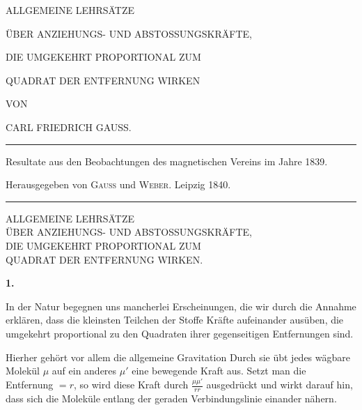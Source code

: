 \clearpage
\thispagestyle{empty}
\begin{center}
\vspace*{0.6in}
{\Large ALLGEMEINE LEHRSÄTZE\par}
\bigskip
ÜBER ANZIEHUNGS- UND ABSTOSSUNGSKRÄFTE,\par
\bigskip
DIE UMGEKEHRT PROPORTIONAL ZUM\par
\bigskip
{\Large QUADRAT DER ENTFERNUNG WIRKEN\par}
\vspace{0.5in}
VON\par
\bigskip
{\large CARL FRIEDRICH GAUSS.\par}
\vfill
\rule{0.85\textwidth}{0.3pt}\par
Resultate aus den Beobachtungen des magnetischen Vereins im Jahre 1839.\par
Herausgegeben von \textsc{Gauss} und \textsc{Weber}. Leipzig 1840.\par
\rule{0.85\textwidth}{0.3pt}
\end{center}
\clearpage
{}
\renewcommand{\Article}[1]{\par\medskip\Needspace{4\baselineskip}\pdfbookmark[1]{Art. #1}{lehrsaetze-art-#1}\centerline{\textbf{#1.}}\nobreak\smallskip}
\begin{center}
ALLGEMEINE LEHRSÄTZE\\
ÜBER ANZIEHUNGS- UND ABSTOSSUNGSKRÄFTE,\\
DIE UMGEKEHRT PROPORTIONAL ZUM\\
QUADRAT DER ENTFERNUNG WIRKEN.
\end{center}
\Article{1}
In der Natur begegnen uns mancherlei Erscheinungen, die wir durch die Annahme erklären, dass die kleinsten Teilchen der Stoffe Kräfte aufeinander ausüben, die umgekehrt proportional zu den Quadraten ihrer gegenseitigen Entfernungen sind.

Hierher gehört vor allem die allgemeine Gravitation Durch sie übt jedes wägbare Molekül $\mu$ auf ein anderes $\mu'$ eine bewegende Kraft aus. Setzt man die Entfernung $=r$, so wird diese Kraft durch $\frac{\mu\mu'}{rr}$ ausgedrückt und wirkt darauf hin, dass sich die Moleküle entlang der geraden Verbindungslinie einander nähern.

